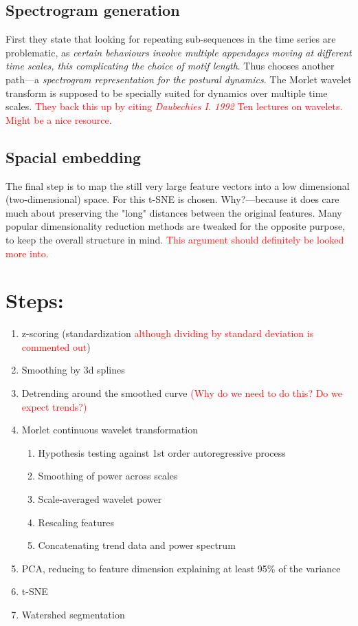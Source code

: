 \documentclass{article}
\theoremstyle{plain}
\theoremstyle{definition}
\theoremstyle{remark}
\begin{document}
\subsection{Spectrogram generation}
First they state that looking for repeating sub-sequences in the time series are problematic, as \textit{certain behaviours involve multiple appendages moving at different time scales, this complicating the choice of motif length}.
Thus \cite{Berman} chooses another path—a \textit{spectrogram representation for the postural dynamics}.
The Morlet wavelet transform is supposed to be specially suited for dynamics over multiple time scales.
\textcolor{red}{They back this up by citing \textit{Daubechies I. 1992} Ten lectures on wavelets.
Might be a nice resource.}

\subsection{Spacial embedding}
The final step is to map the still very large feature vectors into a low dimensional (two-dimensional) space.
For this t-SNE is chosen.
Why?—because it does care much about preserving the "long" distances between the original features.
Many popular dimensionality reduction methods are tweaked for the opposite purpose, to keep the overall structure in mind.
\textcolor{red}{This argument should definitely be looked more into.}


\section{Steps:}
\begin{enumerate}
        \item z-scoring (standardization \textcolor{red}{although dividing by standard deviation is commented out})
        \item Smoothing by 3d splines
        \item Detrending around the smoothed curve \textcolor{red}{(Why do we need to do this? Do we expect trends?)}
        \item Morlet continuous wavelet transformation
                \begin{enumerate}
                        \item Hypothesis testing against 1st order autoregressive process
                        \item Smoothing of power across scales
                        \item Scale-averaged wavelet power
                        \item Rescaling features
                        \item Concatenating trend data and power spectrum
                \end{enumerate}
        \item PCA, reducing to feature dimension explaining at least 95\% of the variance
        \item t-SNE
        \item Watershed segmentation
\end{enumerate}
\newpage
\end{document}
